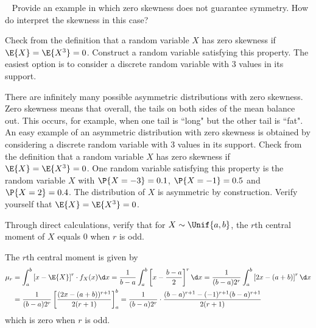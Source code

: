	\begin{exercise}~
		Provide an example in which zero skewness does not guarantee symmetry. How do interpret the skewness in this case?
		\begin{hint}
			Check from the definition that a random variable $X$ has zero skewness if $\E{X} = \E{X^3} = 0$. Construct a random variable satisfying this property. The easiest option is to consider a discrete random variable with 3 values in its support.
		\end{hint}
		\begin{solution}
			There are infinitely many possible asymmetric distributions with zero skewness. Zero skewness means that overall, the tails on both sides of the mean balance out. This occurs, for example, when one tail is ``long" but the other tail is ``fat". An easy example of an asymmetric distribution with zero skewness is obtained by considering a discrete random variable with 3 values in its support. Check from the definition that a random variable $X$ has zero skewness if $\E{X} = \E{X^3} = 0$. One random variable satisfying this property is the random variable $X$ with $\P{X = -3} = 0.1$, $\P{X = -1} = 0.5$ and $\P{X = 2} = 0.4$. The distribution of $X$ is asymmetric by construction. Verify yourself that $\E{X} = \E{X^3} = 0$.
		\end{solution}
	\end{exercise}
	
	\begin{exercise}
		Through direct calculations, verify that for $X \sim \Unif{a, b}$, the $r$th central moment of $X$ equals $0$ when $r$ is odd.
		\begin{solution}
			The $r$th central moment is given by
			\begin{align*}
				\mu_r & = \int_a^b \left[x - \E{X}\right]^r \cdot f_X(x) \d x = \frac{1}{b - a} \int_a^b \left[x - \frac{b - a}{2}\right]^r \d x = \frac{1}{(b - a) 2^r} \int_a^b \left[2x - (a + b)\right]^r \d x \\
				&= \frac{1}{(b - a) 2^r} \left[\frac{(2x - (a + b))^{r + 1}}{2(r + 1)}\right]_a^b = \frac{1}{(b - a) 2^r} \cdot \frac{(b - a)^{r + 1} - (-1)^{r + 1} (b - a)^{r + 1}}{2(r + 1)}
			\end{align*}
			which is zero when $r$ is odd.
		\end{solution}
	\end{exercise}
	
